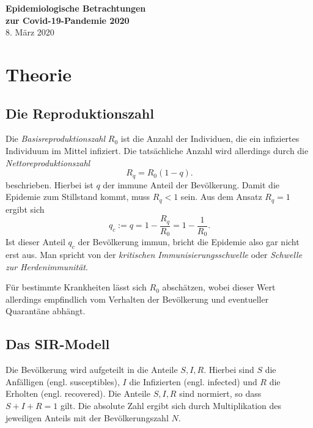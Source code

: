 \documentclass[a4paper,11pt,fleqn,twocolumn,twoside,dvipdfmx]{scrartcl}
\numberwithin{equation}{section}
\begin{document}
\noindent
{\Large\textbf{Epidemiologische Betrachtungen\\
zur Covid-19-Pandemie 2020}}\\[4pt]
8. März 2020

\tableofcontents

\section{Theorie}

\subsection{Die Reproduktionszahl}

Die \emph{Basisreproduktionszahl} $R_0$ ist die Anzahl der Individuen,
die ein infiziertes Individuum im Mittel infiziert. Die tatsächliche
Anzahl wird allerdings durch die \emph{Nettoreproduktionszahl}%
\begin{equation}\label{eq:Nettoreproduktionszahl}
R_q = R_0(1-q).
\end{equation}
beschrieben. Hierbei ist $q$ der immune Anteil der Bevölkerung.
Damit die Epidemie zum Stillstand kommt, muss $R_q<1$ sein.
Aus dem Ansatz $R_q=1$ ergibt sich%
\begin{equation}
q_c := q = 1-\frac{R_q}{R_0} = 1-\frac{1}{R_0}.
\end{equation}
Ist dieser Anteil $q_c$ der Bevölkerung immun, bricht die Epidemie
also gar nicht erst aus. Man spricht von der
\emph{kritischen Immunisierungsschwelle} oder \emph{Schwelle
zur Herdenimmunität}.

Für bestimmte Krankheiten lässt sich $R_0$ abschätzen, wobei
dieser Wert allerdings empfindlich vom Verhalten der Bevölkerung und
eventueller Quarantäne abhängt.


\subsection{Das SIR-Modell}

Die Bevölkerung wird aufgeteilt in die Anteile $S,I,R$. Hierbei sind
$S$ die Anfälligen (engl. susceptibles), $I$ die Infizierten (engl.
infected) und $R$ die Erholten (engl. recovered). Die Anteile
$S,I,R$ sind normiert, so dass $S+I+R=1$ gilt. Die absolute Zahl
ergibt sich durch Multiplikation des jeweiligen Anteils mit der
Bevölkerungszahl $N$.
\end{document}

